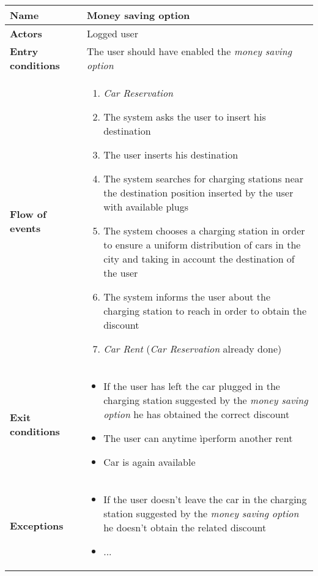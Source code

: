 \begin{tabular}{p{0.25\linewidth}p{0.75\linewidth}}
\toprule
\textbf{Name} & \textbf{Money saving option} \\
\midrule
\textbf{Actors} &  Logged user\\
\midrule
\textbf{Entry conditions} & 
The user should have enabled the \emph{money saving option} \\
\midrule
\textbf{Flow of events} & 
\begin{enumerate}
	\item \emph{Car Reservation}
	\item The system asks the user to insert his destination
	\item The user inserts his destination
	\item The system searches for charging stations near the destination position inserted by the
	user with available plugs
	\item The system chooses a charging station in order to ensure a uniform distribution of cars in
	the city and taking in account the destination of the user
	\item The system informs the user about the charging station to reach in order to obtain the discount
	\item \emph{Car Rent} (\emph{Car Reservation} already done)
\end{enumerate} \\
\midrule
\textbf{Exit conditions} &
\begin{itemize}
	\item If the user has left the car plugged in the charging station suggested by the
	\emph{money saving option} he has obtained the correct discount
	\item The user can  anytime ìperform another rent
	\item Car is again available
\end{itemize} \\
\midrule
\textbf{Exceptions} & 
\begin{itemize}
	\item If the user doesn't leave the car in the charging station suggested by the
	\emph{money saving option} he doesn't obtain the related discount
	\item ...
\end{itemize} \\
\bottomrule
\end{tabular}